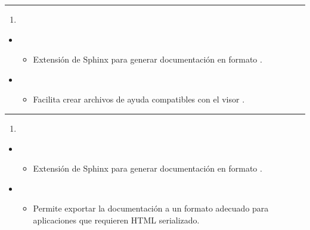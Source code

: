 \documentclass[a4paper,10pt,spanish]{sphinxmanual}
\begin{document}
\bigskip\hrule\bigskip

\begin{enumerate}
%
\setcounter{enumi}{36}
\item {} 
\sphinxAtStartPar
{}

\end{enumerate}
\begin{itemize}
\item {} 
\sphinxAtStartPar
{}
\begin{itemize}
\item {} 
\sphinxAtStartPar
Extensión de Sphinx para generar documentación en formato .

\end{itemize}

\item {} 
\sphinxAtStartPar
{}
\begin{itemize}
\item {} 
\sphinxAtStartPar
Facilita crear archivos de ayuda compatibles con el visor .

\end{itemize}

\end{itemize}


\bigskip\hrule\bigskip

\begin{enumerate}
%
\setcounter{enumi}{37}
\item {} 
\sphinxAtStartPar
{}

\end{enumerate}
\begin{itemize}
\item {} 
\sphinxAtStartPar
{}
\begin{itemize}
\item {} 
\sphinxAtStartPar
Extensión de Sphinx para generar documentación en formato .

\end{itemize}

\item {} 
\sphinxAtStartPar
{}
\begin{itemize}
\item {} 
\sphinxAtStartPar
Permite exportar la documentación a un formato adecuado para aplicaciones que requieren HTML serializado.

\end{itemize}

\end{itemize}
\end{document}
